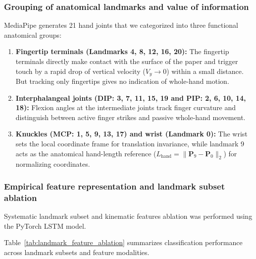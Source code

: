 \subsubsection{Grouping of anatomical landmarks and value of information}
MediaPipe generates 21 hand joints that we categorized into three functional anatomical groups:
\begin{enumerate}
    \item \textbf{Fingertip terminals (Landmarks 4, 8, 12, 16, 20):} The fingertip terminals directly make contact with the surface of the paper and trigger touch by a rapid drop of vertical velocity ($V_y \to 0$) within a small distance. But tracking only fingertips gives no indication of whole-hand motion.
    \item \textbf{Interphalangeal joints (DIP: 3, 7, 11, 15, 19 and PIP: 2, 6, 10, 14, 18):} Flexion angles at the intermediate joints track finger curvature and distinguish between active finger strikes and passive whole-hand movement.
    \item \textbf{Knuckles (MCP: 1, 5, 9, 13, 17) and wrist (Landmark 0):} The wrist sets the local coordinate frame for translation invariance, while landmark 9 acts as the anatomical hand-length reference ($L_{\text{hand}} = \|\mathbf{P}_9 - \mathbf{P}_0\|_2$) for normalizing coordinates.
\end{enumerate}

\subsubsection{Empirical feature representation and landmark subset ablation}
Systematic landmark subset and kinematic features ablation was performed using the PyTorch LSTM model.

Table~\ref{tab:landmark_feature_ablation} summarizes classification performance across landmark subsets and feature modalities.

